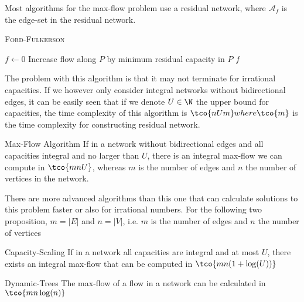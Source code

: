\newpage
{}

Most algorithms for the max-flow problem use a residual network, where $\mathcal{A}_f$ is the edge-set in the residual network.

\begin{algorithm}
    \caption{\textsc{Ford-Fulkerson}}
    \begin{algorithmic}[1]
            \State $f \gets 0$ 
             
                \State Increase flow along $P$ by minimum residual capacity in $P$
            \EndWhile
            \State \Return $f$ 
        \EndProcedure
    \end{algorithmic}
\end{algorithm}

The problem with this algorithm is that it may not terminate for irrational capacities. If we however only consider integral networks without bidirectional edges, it can be easily seen that if we denote $U \in \N$ the upper bound for capacities, the time complexity of this algorithm is $\tco{nUm} where \tco{m}$ is the time complexity for constructing residual network.
\begin{theorem}[]{Max-Flow Algorithm}
    If in a network without bidirectional edges and all capacities integral and no larger than $U$, there is an integral max-flow we can compute in $\tco{mnU}$, whereas $m$ is the number of edges and $n$ the number of vertices in the network.
\end{theorem}

There are more advanced algorithms than this one that can calculate solutions to this problem faster or also for irrational numbers.
For the following two proposition, $m = |E|$ and $n = |V|$, i.e. $m$ is the number of edges and $n$ the number of vertices

\begin{proposition}[]{Capacity-Scaling}
    If in a network all capacities are integral and at most $U$, there exists an integral max-flow that can be computed in $\tco{mn(1 + \log(U))}$
\end{proposition}

\begin{proposition}[]{Dynamic-Trees}
    The max-flow of a flow in a network can be calculated in $\tco{mn\log(n)}$
\end{proposition}



